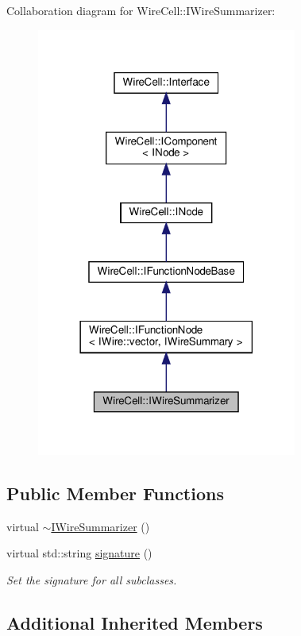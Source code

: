 Collaboration diagram for Wire\+Cell\+:\+:I\+Wire\+Summarizer\+:
\nopagebreak
\begin{figure}[H]
\begin{center}
\leavevmode
\includegraphics[width=242pt]{class_wire_cell_1_1_i_wire_summarizer__coll__graph}
\end{center}
\end{figure}
\subsection*{Public Member Functions}
\begin{DoxyCompactItemize}
\item 
virtual \hyperlink{class_wire_cell_1_1_i_wire_summarizer_aa0442b80eeba9642175c3afce494c23d}{$\sim$\+I\+Wire\+Summarizer} ()
\item 
virtual std\+::string \hyperlink{class_wire_cell_1_1_i_wire_summarizer_aad4b2478a6e204a3333f3aa84e36a99a}{signature} ()
\begin{DoxyCompactList}\small\item\em Set the signature for all subclasses. \end{DoxyCompactList}\end{DoxyCompactItemize}
\subsection*{Additional Inherited Members}


